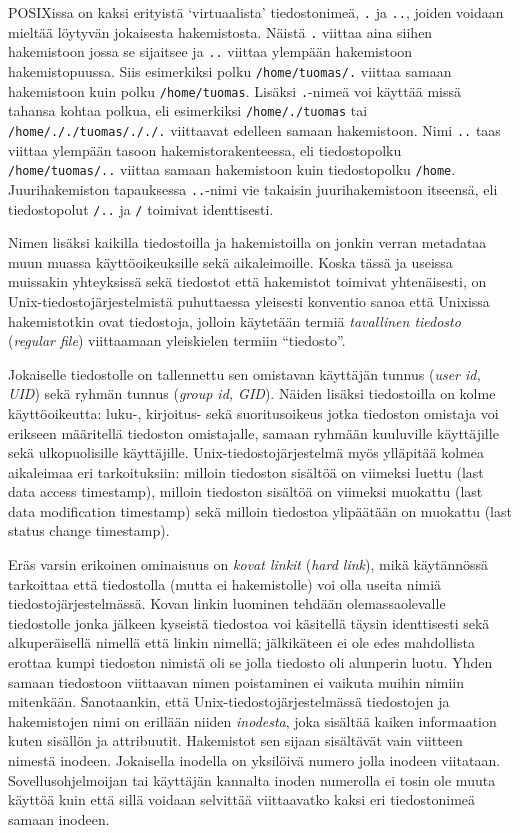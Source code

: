 POSIXissa on kaksi erityistä `virtuaalista' tiedostonimeä, \texttt{.} ja \texttt{..}, joiden voidaan mieltää löytyvän jokaisesta hakemistosta.
Näistä \texttt{.} viittaa aina siihen hakemistoon jossa se sijaitsee ja \texttt{..} viittaa ylempään hakemistoon hakemistopuussa.
Siis esimerkiksi polku \texttt{/home/tuomas/.} viittaa samaan hakemistoon kuin polku \texttt{/home/tuomas}.
Lisäksi \texttt{.}-nimeä voi käyttää missä tahansa kohtaa polkua,
eli esimerkiksi \texttt{/home/./tuomas} tai \texttt{/home/././tuomas/././.} viittaavat edelleen samaan hakemistoon.
Nimi \texttt{..} taas viittaa ylempään tasoon hakemistorakenteessa,
eli tiedostopolku \texttt{/home/tuomas/..} viittaa samaan hakemistoon kuin tiedostopolku \texttt{/home}.
Juurihakemiston tapauksessa \texttt{..}-nimi vie takaisin juurihakemistoon itseensä, eli tiedostopolut \texttt{/..} ja \texttt{/} toimivat identtisesti.

Nimen lisäksi kaikilla tiedostoilla ja hakemistoilla on jonkin verran metadataa muun muassa käyttöoikeuksille sekä aikaleimoille.
Koska tässä ja useissa muissakin yhteyksissä sekä tiedostot että hakemistot toimivat yhtenäisesti,
on Unix-tiedostojärjestelmistä puhuttaessa yleisesti konventio sanoa että Unixissa hakemistotkin ovat tiedostoja,
jolloin käytetään termiä \emph{tavallinen tiedosto} (\emph{regular file}) viittaamaan yleiskielen termiin ``tiedosto''.

Jokaiselle tiedostolle on tallennettu sen omistavan käyttäjän tunnus (\emph{user id, UID}) sekä ryhmän tunnus (\emph{group id, GID}).
Näiden lisäksi tiedostoilla on kolme käyttöoikeutta: luku-, kirjoitus- sekä suoritusoikeus jotka tiedoston omistaja voi erikseen määritellä tiedoston omistajalle, samaan ryhmään kuuluville käyttäjille sekä ulkopuolisille käyttäjille.
Unix-tiedostojärjestelmä myös ylläpitää kolmea aikaleimaa eri tarkoituksiin:
milloin tiedoston sisältöä on viimeksi luettu (last data access timestamp), milloin tiedoston sisältöä on viimeksi muokattu (last data modification timestamp) sekä milloin tiedostoa ylipäätään on muokattu (last status change timestamp).

Eräs varsin erikoinen ominaisuus on \emph{kovat linkit} (\emph{hard link}), mikä käytännössä tarkoittaa että tiedostolla (mutta ei hakemistolle) voi olla useita nimiä tiedostojärjestelmässä.
Kovan linkin luominen tehdään olemassaolevalle tiedostolle jonka jälkeen kyseistä tiedostoa voi käsitellä täysin identtisesti sekä alkuperäisellä nimellä että linkin nimellä;
jälkikäteen ei ole edes mahdollista erottaa kumpi tiedoston nimistä oli se jolla tiedosto oli alunperin luotu.
Yhden samaan tiedostoon viittaavan nimen poistaminen ei vaikuta muihin nimiin mitenkään.
Sanotaankin, että Unix-tiedostojärjestelmässä tiedostojen ja hakemistojen nimi on erillään niiden \emph{inodesta}, joka sisältää kaiken informaation kuten sisällön ja attribuutit.
Hakemistot sen sijaan sisältävät vain viitteen nimestä inodeen.
Jokaisella inodella on yksilöivä numero jolla inodeen viitataan.
Sovellusohjelmoijan tai käyttäjän kannalta inoden numerolla ei tosin ole muuta käyttöä kuin että sillä voidaan selvittää viittaavatko kaksi eri tiedostonimeä samaan inodeen.


